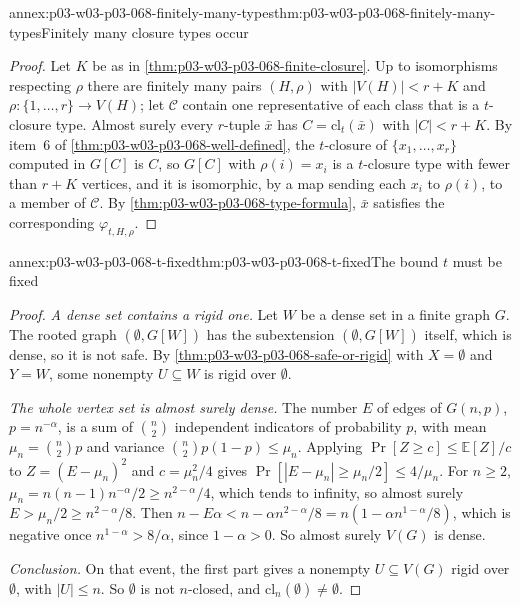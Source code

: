 \begin{annexitem}{annex:p03-w03-p03-068-finitely-many-types}{thm:p03-w03-p03-068-finitely-many-types}{Finitely many closure types occur}
\begin{proof}
Let \(K\) be as in \cref{thm:p03-w03-p03-068-finite-closure}.  Up to
isomorphisms respecting \(\rho\) there are finitely many pairs \((H,\rho)\)
with \(|V(H)|<r+K\) and \(\rho\colon\{1,\ldots,r\}\to V(H)\); let \(\mathcal C\)
contain one representative of each class that is a \(t\)-closure type.
Almost surely every \(r\)-tuple \(\bar x\) has
\(C=\mathrm{cl}_t(\bar x)\) with \(|C|<r+K\).  By item~6 of
\cref{thm:p03-w03-p03-068-well-defined}, the \(t\)-closure of
\(\{x_1,\ldots,x_r\}\) computed in \(G[C]\) is \(C\), so \(G[C]\) with
\(\rho(i)=x_i\) is a \(t\)-closure type with fewer than \(r+K\) vertices, and it
is isomorphic, by a map sending each \(x_i\) to \(\rho(i)\), to a member of
\(\mathcal C\).  By \cref{thm:p03-w03-p03-068-type-formula}, \(\bar x\)
satisfies the corresponding \(\varphi_{t,H,\rho}\).
\end{proof}
\end{annexitem}

\begin{annexitem}{annex:p03-w03-p03-068-t-fixed}{thm:p03-w03-p03-068-t-fixed}{The bound \(t\) must be fixed}
\begin{proof}
\emph{A dense set contains a rigid one.}  Let \(W\) be a dense set in a finite
graph \(G\).  The rooted graph \((\emptyset,G[W])\) has the subextension
\((\emptyset,G[W])\) itself, which is dense, so it is not safe.  By
\cref{thm:p03-w03-p03-068-safe-or-rigid} with \(X=\emptyset\) and \(Y=W\),
some nonempty \(U\subseteq W\) is rigid over \(\emptyset\).

\emph{The whole vertex set is almost surely dense.}  The number \(E\) of edges
of \(G(n,p)\), \(p=n^{-\alpha}\), is a sum of \(\binom n2\) independent
indicators of probability \(p\), with mean \(\mu_n=\binom n2p\) and variance
\(\binom n2p(1-p)\leq\mu_n\).  Applying \(\Pr[Z\geq c]\leq\mathbb E[Z]/c\) to
\(Z=(E-\mu_n)^2\) and \(c=\mu_n^2/4\) gives
\(\Pr[|E-\mu_n|\geq\mu_n/2]\leq4/\mu_n\).  For \(n\geq2\),
\(\mu_n=n(n-1)n^{-\alpha}/2\geq n^{2-\alpha}/4\), which tends to infinity, so
almost surely \(E>\mu_n/2\geq n^{2-\alpha}/8\).  Then
\(n-E\alpha<n-\alpha n^{2-\alpha}/8=n(1-\alpha n^{1-\alpha}/8)\), which is
negative once \(n^{1-\alpha}>8/\alpha\), since \(1-\alpha>0\).  So almost
surely \(V(G)\) is dense.

\emph{Conclusion.}  On that event, the first part gives a nonempty
\(U\subseteq V(G)\) rigid over \(\emptyset\), with \(|U|\leq n\).  So
\(\emptyset\) is not \(n\)-closed, and
\(\mathrm{cl}_n(\emptyset)\neq\emptyset\).
\end{proof}
\end{annexitem}

